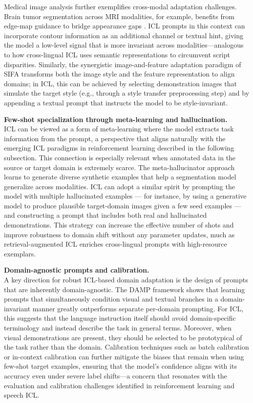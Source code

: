 \documentclass[11pt]{article}
\begin{document}
Medical image analysis further exemplifies cross-modal adaptation challenges. Brain tumor segmentation across MRI modalities, for example, benefits from edge-map guidance to bridge appearance gaps \cite{ref142}. ICL prompts in this context can incorporate contour information as an additional channel or textual hint, giving the model a low-level signal that is more invariant across modalities---analogous to how cross-lingual ICL uses semantic representations to circumvent script disparities. Similarly, the synergistic image-and-feature adaptation paradigm of SIFA \cite{ref143} transforms both the image style and the feature representation to align domains; in ICL, this can be achieved by selecting demonstration images that simulate the target style (e.g., through a style transfer preprocessing step) and by appending a textual prompt that instructs the model to be style-invariant.

\textbf{Few-shot specialization through meta-learning and hallucination.}\\
ICL can be viewed as a form of meta-learning where the model extracts task information from the prompt, a perspective that aligns naturally with the emerging ICL paradigms in reinforcement learning described in the following subsection. This connection is especially relevant when annotated data in the source or target domain is extremely scarce. The meta-hallucinator approach \cite{ref144} learns to generate diverse synthetic examples that help a segmentation model generalize across modalities. ICL can adopt a similar spirit by prompting the model with multiple hallucinated examples --- for instance, by using a generative model to produce plausible target-domain images given a few seed examples --- and constructing a prompt that includes both real and hallucinated demonstrations. This strategy can increase the effective number of shots and improve robustness to domain shift without any parameter updates, much as retrieval-augmented ICL enriches cross-lingual prompts with high-resource exemplars.

\textbf{Domain-agnostic prompts and calibration.}\\
A key direction for robust ICL-based domain adaptation is the design of prompts that are inherently domain-agnostic. The DAMP framework \cite{ref139} shows that learning prompts that simultaneously condition visual and textual branches in a domain-invariant manner greatly outperforms separate per-domain prompting. For ICL, this suggests that the language instruction itself should avoid domain-specific terminology and instead describe the task in general terms. Moreover, when visual demonstrations are present, they should be selected to be prototypical of the task rather than the domain. Calibration techniques such as batch calibration or in-context calibration can further mitigate the biases that remain when using few-shot target examples, ensuring that the model's confidence aligns with its accuracy even under severe label shifts---a concern that resonates with the evaluation and calibration challenges identified in reinforcement learning and speech ICL.
\end{document}
